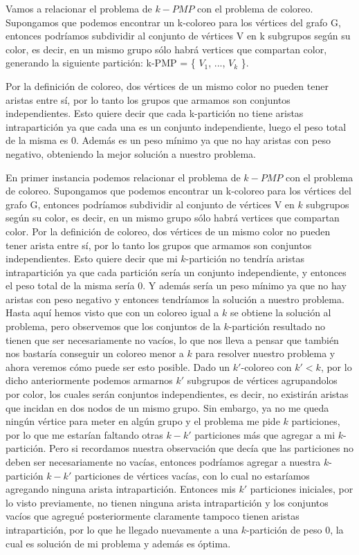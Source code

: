 Vamos a relacionar el problema de $k-PMP$ con el problema de coloreo. Supongamos que podemos encontrar un k-coloreo para los vértices del grafo G, entonces podríamos subdividir al conjunto de vértices V en k subgrupos según su color, es decir, en un mismo grupo sólo habrá vertices que compartan color, generando la siguiente partición: k-PMP = \{ $V_1$, ..., $V_k$ \}. 

Por la definición de coloreo, dos vértices de un mismo color no pueden tener aristas entre sí, por lo tanto los grupos que armamos son conjuntos independientes. Esto quiere decir que cada k-partición no tiene aristas intrapartición ya que cada una es un conjunto independiente, luego el peso total de la misma es $0$. Además es un peso mínimo ya que no hay aristas con peso negativo, obteniendo la mejor solución a nuestro problema.


En primer instancia podemos relacionar el problema de $k-PMP$ con el problema de coloreo. Supongamos que podemos encontrar un k-coloreo para los vértices del grafo G, entonces podríamos subdividir al conjunto de vértices V en $k$ subgrupos según su color, es decir, en un mismo grupo sólo habrá vertices que compartan color. Por la definición de coloreo, dos vértices de un mismo color no pueden tener arista entre sí, por lo tanto los grupos que armamos son conjuntos independientes. Esto quiere decir que mi $k$-partición no tendría aristas intrapartición ya que cada partición sería un conjunto independiente, y entonces el peso total de la misma sería $0$. Y además sería un peso mínimo ya que no hay aristas con peso negativo y entonces tendríamos la solución a nuestro problema. Hasta aquí hemos visto que con un coloreo igual a $k$ se obtiene la solución al problema, pero observemos que los conjuntos de la $k$-partición resultado no tienen que ser necesariamente no vacíos, lo que nos lleva a pensar que también nos bastaría conseguir un coloreo menor a $k$ para resolver nuestro problema y ahora veremos cómo puede ser esto posible. Dado un $k'$-coloreo con $k'<k$, por lo dicho anteriormente podemos armarnos $k'$ subgrupos de vértices agrupandolos por color, los cuales serán conjuntos independientes, es decir, no existirán aristas que incidan en dos nodos de un mismo grupo. Sin embargo, ya no me queda ningún vértice para meter en algún grupo y el problema me pide $k$ particiones, por lo que me estarían faltando otras $k-k'$ particiones más que agregar a mi $k$-partición. Pero si recordamos nuestra observación que decía que las particiones no deben ser necesariamente no vacías, entonces podríamos agregar a nuestra $k$-partición $k-k'$ particiones de vértices vacías, con lo cual no estaríamos agregando ninguna arista intrapartición. Entonces mis $k'$ particiones iniciales, por lo visto previamente, no tienen ninguna arista intrapartición y los conjuntos vacíos que agregué posteriormente claramente tampoco tienen aristas intrapartición, por lo que he llegado nuevamente a una $k$-partición de peso $0$, la cual es solución de mi problema y además es óptima.

